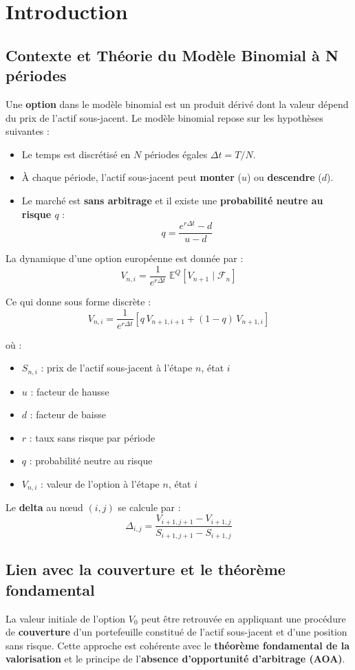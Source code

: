 \documentclass[12pt,a4paper]{report}
\begin{document}
\clearpage
\chapter*{Introduction}

\section*{Contexte et Théorie du Modèle Binomial à N périodes}
Une \textbf{option} dans le modèle binomial est un produit dérivé dont la valeur dépend du prix de l'actif sous-jacent.  
Le modèle binomial repose sur les hypothèses suivantes :
\begin{itemize}
    \item Le temps est discrétisé en $N$ périodes égales $\Delta t = T/N$.
    \item À chaque période, l’actif sous-jacent peut \textbf{monter} ($u$) ou \textbf{descendre} ($d$).
    \item Le marché est \textbf{sans arbitrage} et il existe une \textbf{probabilité neutre au risque $q$} :
    \[
    q = \frac{e^{r\Delta t}-d}{u-d}
    \]
\end{itemize}

La dynamique d’une option européenne est donnée par :
\[
V_{n,i} = \frac{1}{e^{r\Delta t}} \; \mathbb{E}^Q[V_{n+1} \mid \mathcal{F}_n]
\]

Ce qui donne sous forme discrète :
\[
V_{n,i} = \frac{1}{e^{r\Delta t}}\left[q \, V_{n+1,i+1} + (1-q)\,V_{n+1,i}\right]
\]

où :
\begin{itemize}
    \item $S_{n,i}$ : prix de l'actif sous-jacent à l'étape $n$, état $i$  
    \item $u$ : facteur de hausse  
    \item $d$ : facteur de baisse  
    \item $r$ : taux sans risque par période  
    \item $q$ : probabilité neutre au risque  
    \item $V_{n,i}$ : valeur de l'option à l'étape $n$, état $i$
\end{itemize}

Le \textbf{delta} au nœud $(i,j)$ se calcule par :
\[
\Delta_{i,j} = \frac{V_{i+1,j+1} - V_{i+1,j}}{S_{i+1,j+1} - S_{i+1,j}}
\]

\section*{Lien avec la couverture et le théorème fondamental}
La valeur initiale de l'option $V_0$ peut être retrouvée en appliquant une procédure de \textbf{couverture} d'un portefeuille constitué de l'actif sous-jacent et d'une position sans risque.  
Cette approche est cohérente avec le \textbf{théorème fondamental de la valorisation} et le principe de l'\textbf{absence d'opportunité d'arbitrage (AOA)}.
\end{document}
